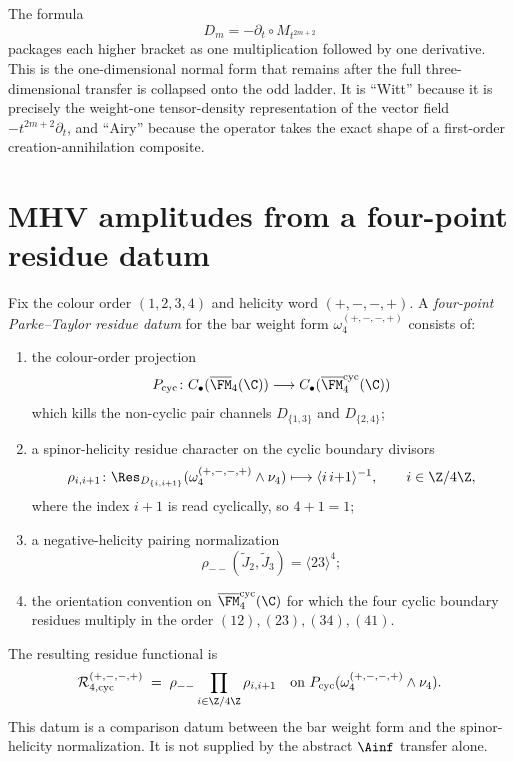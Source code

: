 \begin{remark}
\label{rem:cbt-airy-witt-name}
The formula
\[
D_m=-\partial_t\circ M_{t^{2m+2}}
\]
packages each higher bracket as one multiplication followed by one derivative. This is the one-dimensional normal form that remains after the full three-dimensional transfer is collapsed onto the odd ladder. It is ``Witt'' because it is precisely the weight-one tensor-density representation of the vector field $-t^{2m+2}\partial_t$, and ``Airy'' because the operator takes the exact shape of a first-order creation-annihilation composite.
\end{remark}


\section{MHV amplitudes from a four-point residue datum}
\label{sec:cbt-mhv-bar-complex}

\begin{definition}
\label{def:cbt-pt-residue-datum}
Fix the colour order \((1,2,3,4)\) and helicity word
\((+,-,-,+)\).  A \emph{four-point Parke--Taylor residue datum} for
the bar weight form \(\omega_4^{(+,-,-,+)}\) consists of:
\begin{enumerate}[label=\textup{(\roman*)}]
\item the colour-order projection
\[
P_{\mathrm{cyc}}\colon C_\bullet(\overline{\FM}_4(\C))
\longrightarrow C_\bullet(\overline{\FM}^{\mathrm{cyc}}_4(\C))
\]
which kills the non-cyclic pair channels
\(D_{\{1,3\}}\) and \(D_{\{2,4\}}\);
\item a spinor-helicity residue character on the cyclic boundary
divisors
\[
\rho_{i,i+1}\colon
\Res_{D_{\{i,i+1\}}}
(\omega_4^{(+,-,-,+)}\wedge\nu_4)
\longmapsto
\langle i\,i{+}1\rangle^{-1},
\qquad i\in\Z/4\Z,
\]
where the index \(i+1\) is read cyclically, so \(4+1=1\);
\item a negative-helicity pairing normalization
\[
\rho_{--}(\tilde J_2,\tilde J_3)=\langle 23\rangle^4;
\]
\item the orientation convention on
\(\overline{\FM}^{\mathrm{cyc}}_4(\C)\) for which the four cyclic
boundary residues multiply in the order
\((12),(23),(34),(41)\).
\end{enumerate}
The resulting residue functional is
\[
\mathcal R^{(+,-,-,+)}_{4,\mathrm{cyc}}
\;=\;
\rho_{--}\prod_{i\in\Z/4\Z}\rho_{i,i+1}
\quad
\text{on }P_{\mathrm{cyc}}
(\omega_4^{(+,-,-,+)}\wedge\nu_4).
\]
This datum is a comparison datum between the bar weight form and the
spinor-helicity normalization.  It is not supplied by the abstract
\(\Ainf\) transfer alone.
\end{definition}


